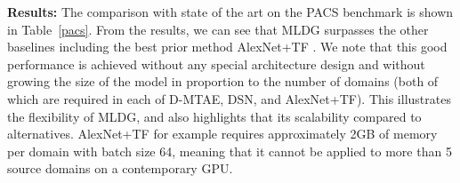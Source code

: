 \documentclass[letterpaper]{article} \usepackage{aaai18}  \usepackage{times}  \usepackage{helvet}  \usepackage{courier}  \usepackage{url}  \usepackage{graphicx}  \usepackage{amsmath}
\newcommand{\keypoint}[1]{\vspace{0.1cm}\noindent\textbf{#1}\quad}
\begin{document}
{\begin{table}[t]
\centering
\caption{PACS benchmark: Ablation study of MLDG.}
\label{eva-imp-mldg}
\end{table}

\begin{table}[t]
\centering
\caption{PACS benchmark: Evaluation of MLDG variants.}
\label{eva-variants-mldg}
\end{table}

\keypoint{Results:}  The comparison with state of the art on the PACS benchmark is shown in Table~\ref{pacs}. From the results, we can see that  MLDG surpasses the other baselines including the best prior method AlexNet+TF \cite{da2017dg}. We note that this good performance is achieved without any special architecture design  and without growing the size of the model in proportion to the number of domains (both of which are required in each of D-MTAE, DSN, and AlexNet+TF). This illustrates the flexibility of MLDG, and also highlights that its scalability compared to alternatives. AlexNet+TF for example requires approximately 2GB of memory per domain with batch size 64, meaning that it cannot be applied to more than 5 source domains on a contemporary GPU.

}
\end{document}
